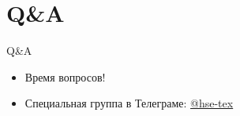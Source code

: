 \section{Q\&A}

\begin{frame}{Q\&A}

\begin{itemize}
    \item Время вопросов!
    \item Специальная группа в Телеграме: 
    \href{https://t.me/hsetexdisc}{\color{blue} @hse-tex}
\end{itemize}

\end{frame}
